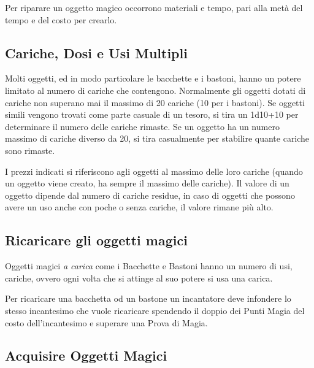 \begin{multicols}{2}
Per riparare un oggetto magico occorrono materiali e tempo, pari alla metà del tempo e del costo per crearlo.

\subsection{Cariche, Dosi e Usi Multipli}

\label{cariche-dosi-e-usi-multipli}

Molti oggetti, ed in modo particolare le bacchette e i bastoni, hanno un potere limitato al numero di cariche che contengono. Normalmente gli oggetti dotati di cariche non superano mai il massimo di 20 cariche (10 per i bastoni). Se oggetti simili vengono trovati come parte casuale di un tesoro, si tira un 1d10+10 per determinare il numero delle cariche rimaste. Se un oggetto ha un numero massimo di cariche diverso da 20, si tira casualmente per stabilire quante cariche sono rimaste.

I prezzi indicati si riferiscono agli oggetti al massimo delle loro cariche (quando un oggetto viene creato, ha sempre il massimo delle cariche). Il valore di un oggetto dipende dal numero di cariche residue, in caso di oggetti che possono avere un uso anche con poche o senza cariche, il valore rimane più alto.

\subsection{Ricaricare gli oggetti magici}\label{Ricaricare gli oggetti magici}

Oggetti magici \emph{a carica} come i Bacchette e Bastoni hanno un numero di usi, cariche, ovvero ogni volta che si attinge al suo potere si usa una carica.

Per ricaricare una bacchetta od un bastone un incantatore deve infondere lo stesso incantesimo che vuole ricaricare spendendo il doppio dei Punti Magia del costo dell'incantesimo e superare una Prova di Magia.


\end{multicols}

\subsection{Acquisire Oggetti Magici}

\label{acquisire-oggetti-magici}

